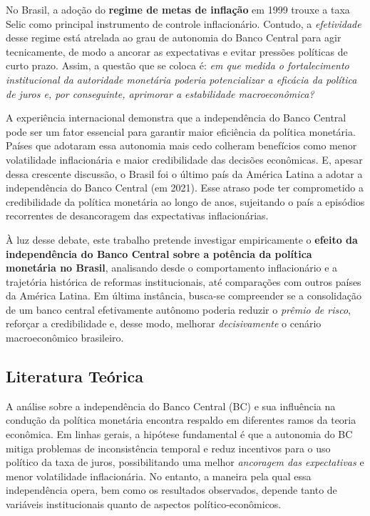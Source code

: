 \documentclass[a4paper,12pt]{article}[abnt2]
\begin{document}
No Brasil, a adoção do \textbf{regime de metas de inflação} em 1999 trouxe a taxa Selic como principal instrumento de controle inflacionário. Contudo, a \emph{efetividade} desse regime está atrelada ao grau de autonomia do Banco Central para agir tecnicamente, de modo a ancorar as expectativas e evitar pressões políticas de curto prazo. Assim, a questão que se coloca é: \emph{em que medida o fortalecimento institucional da autoridade monetária poderia potencializar a eficácia da política de juros e, por conseguinte, aprimorar a estabilidade macroeconômica?}

A experiência internacional demonstra que a independência do Banco Central pode ser um fator essencial para garantir maior eficiência da política monetária. Países que adotaram essa autonomia mais cedo colheram benefícios como menor volatilidade inflacionária e maior credibilidade das decisões econômicas. E, apesar dessa crescente discussão, o Brasil foi o último país da América Latina a adotar a independência do Banco Central (em 2021). Esse atraso pode ter comprometido a credibilidade da política monetária ao longo de anos, sujeitando o país a episódios recorrentes de desancoragem das expectativas inflacionárias.

À luz desse debate, este trabalho pretende investigar empiricamente o \textbf{efeito da independência do Banco Central sobre a potência da política monetária no Brasil}, analisando desde o comportamento inflacionário e a trajetória histórica de reformas institucionais, até comparações com outros países da América Latina. Em última instância, busca-se compreender se a consolidação de um banco central efetivamente autônomo poderia reduzir o \emph{prêmio de risco}, reforçar a credibilidade e, desse modo, melhorar \emph{decisivamente} o cenário macroeconômico brasileiro.



\subsection{\textbf{Literatura Teórica}}
A análise sobre a independência do Banco Central (BC) e sua influência na condução da política monetária encontra respaldo em diferentes ramos da teoria econômica. Em linhas gerais, a hipótese fundamental é que a autonomia do BC mitiga problemas de inconsistência temporal e reduz incentivos para o uso político da taxa de juros, possibilitando uma melhor \emph{ancoragem das expectativas} e menor volatilidade inflacionária. No entanto, a maneira pela qual essa independência opera, bem como os resultados observados, depende tanto de variáveis institucionais quanto de aspectos político-econômicos.
\end{document}
